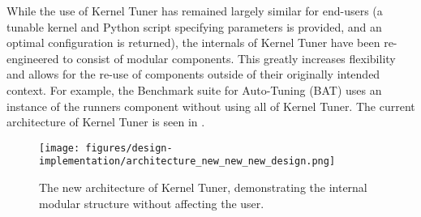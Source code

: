 While the use of Kernel Tuner has remained largely similar for end-users (a tunable kernel and Python script specifying parameters is provided, and an optimal configuration is returned), the internals of Kernel Tuner have been re-engineered to consist of modular components. 
This greatly increases flexibility and allows for the re-use of components outside of their originally intended context. 
For example, the Benchmark suite for Auto-Tuning (BAT) \cite{BenchmarkingSuiteKerneltuners} uses an instance of the runners component without using all of Kernel Tuner. 
The current architecture of Kernel Tuner is seen in . 

\begin{figure}
    \centering
    \texttt{[image: figures/design-implementation/architecture\_new\_new\_new\_design.png]}
    \caption{The new architecture of Kernel Tuner, demonstrating the internal modular structure without affecting the user.}
    \label{fig:architecture_new}
\end{figure}


